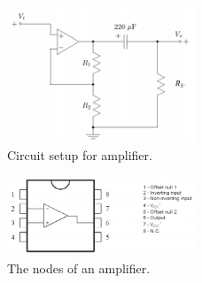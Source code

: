 \documentclass [utf8] {article}
\begin{document}
{	\begin{figure}[H]
		\begin{small}
			\begin{center}
				\includegraphics[width=0.5\textwidth]{figures/Figure12.png}
			\end{center}
			\caption{Circuit setup for amplifier.}
			\label{fig:setup2}
		\end{small}
	\end{figure}

	\begin{figure}[H]
		\begin{small}
			\begin{center}
				\includegraphics[width=0.5\textwidth]{figures/Figure13.png}
			\end{center}
			\caption{The nodes of an amplifier.}
			\label{fig:amp}
		\end{small}
	\end{figure}
}
\end{document}
